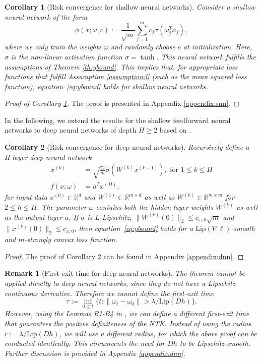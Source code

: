 \documentclass[10pt]{article} %
\def\eqref#1{equation~\ref{#1}}
\newcommand{\bR}{\mathbb{R}}
\newtheorem{corollary}{Corollary}
\newtheorem{remark}{Remark}
\begin{document}
\begin{corollary}[Risk convergence for shallow neural networks]\label{corollary:snn}
    Consider a shallow neural network of the form 
    $$\phi(x;\omega,c):=\frac{1}{\sqrt{m}}\sum_{j=1}^mc_j\sigma(\omega_j^T x_j),$$
    where we only train the weights $\omega$ and randomly choose $c$ at initialization. Here, $\sigma$ is the non-linear activation function $\sigma=\tanh$. This neural network fulfills the assumptions of Theorem \ref{th:ybound}. This implies that, for appropriate loss functions that fulfill Assumption \ref{assumption:l} (such as the mean squared loss function), \eqref{eq:ybound} holds for shallow neural networks. 
\end{corollary}
\begin{proof}[Proof of Corollary \ref{corollary:snn}]
    The proof is presented in Appendix \ref{appendix:snn}.
\end{proof}
In the following, we extend the results for the shallow feedforward neural networks to deep neural networks of depth $H \geq 2$ based on \cite{du2018gradient}.
\begin{corollary}[Risk convergence for deep neural networks]\label{corollary:dnn}
    Recursively define a H-layer deep neural network 
    \begin{align*}
        x^{(k)}&=\sqrt{\frac{c_\sigma}{m}}\sigma(W^{(k)}x^{(k-1)}), \text{ for }1\leq k\leq H\\
        f(x;\omega)&=a^Tx^{(H)},
    \end{align*}
    for input data $x^{(0)}\in\bR^d$ and $W^{(1)}\in\bR^{m\times d}$ as well as $W^{(k)}\in\bR^{m\times m}$ for $2\leq h\leq H$. The parameter $\omega$ contains both the hidden layer weights $W^{(k)}$ as well as the output layer $a$. If $\sigma$ is $L$-Lipschitz, $\|W^{(k)}(0)\|_2\leq c_{\omega,0}\sqrt{m}$ and $\|x^{(k)}(0)\|_2\leq c_{x,0}$, then \eqref{eq:ybound} holds for a $\mathrm{Lip}(\nabla\ell)$-smooth and $m$-strongly convex loss function. 
\end{corollary}
\begin{proof}
    The proof of Corollary \ref{corollary:dnn} can be found in Appendix \ref{appendix:dnn}.
\end{proof}
\begin{remark}[First-exit time for deep neural networks]\label{remark:DNNs}
    The theorem cannot be applied directly to deep neural networks, since they do not have a Lipschitz continuous derivative. Therefore we cannot define the first-exit time 
    $$\tau:=\inf_{0\leq t}\{t:\|\omega_t-\omega_0\|>\lambda/\text{Lip}(Dh)\}.$$
    However, using the Lemmas B1-B4 in \cite{du2019gradientdescentfindsglobal}, we can define a different first-exit time that guarantees the positive definiteness of the NTK. Instead of using the radius $r:=\lambda/\text{Lip}(Dh)$, we will use a different radius, for which the above proof can be conducted identically. This circumvents the need for $Dh$ to be Lipschitz-smooth. Further discussion is provided in Appendix \ref{appendix:dnn}.
\end{remark}
\end{document}
